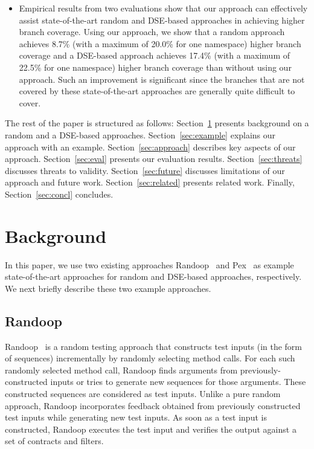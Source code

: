 \documentclass{sig-alternate}
\begin{document}
\begin{itemize}
\item Empirical results from two evaluations show that our approach can effectively assist state-of-the-art random and DSE-based approaches in achieving higher branch coverage. Using our approach, we show that a random approach achieves 8.7\% (with a maximum of 20.0\% for one namespace) higher branch coverage and a DSE-based approach achieves 17.4\% (with a maximum of 22.5\% for one namespace) higher branch coverage than without using our approach. Such an improvement is significant since the branches that are not covered by these state-of-the-art approaches are generally quite difficult to cover.
\end{itemize}

The rest of the paper is structured as follows:
Section~\ref{sec:background} presents background on a random and a DSE-based approaches.
Section~\ref{sec:example} explains our approach with an example.
Section~\ref{sec:approach} describes key aspects of our approach.
Section~\ref{sec:eval} presents our evaluation results.
Section~\ref{sec:threats} discusses threats to validity.
Section~\ref{sec:future} discusses limitations of our approach and future work.
Section~\ref{sec:related} presents related work.
Finally, Section~\ref{sec:concl} concludes. 


\section{Background}
\label{sec:background}

In this paper, we use two existing approaches Randoop~\cite{pacheco:feedback} and Pex~\cite{tillman:pexwhite} as example state-of-the-art approaches for random and DSE-based approaches, respectively. We next briefly describe these two example approaches.

\subsection{Randoop}

Randoop~\cite{pacheco:feedback} is a random testing approach that constructs test inputs (in the form of sequences) incrementally by randomly selecting method calls. For each such randomly selected method call, Randoop finds arguments from previously-constructed inputs or tries to generate new sequences for those arguments. These constructed sequences are considered as test inputs. Unlike a pure random approach, Randoop incorporates feedback obtained from previously constructed test inputs while generating new test inputs. As soon as a test input is constructed, Randoop executes the test input and verifies the output against a set of contracts and filters. 
\end{document}
